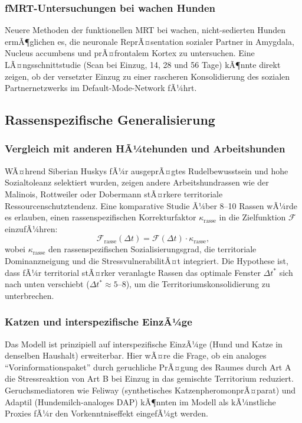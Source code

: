 ﻿\documentclass[12pt, a4paper]{article}
\theoremstyle{plain}
\theoremstyle{definition}
\theoremstyle{remark}
\newcommand{\dt}{\Delta t}
\begin{document}
\subsubsection{fMRT-Untersuchungen bei wachen Hunden}

Neuere Methoden der funktionellen MRT bei wachen, nicht-sedierten Hunden
\cite{berns2012dogs} ermÃ¶glichen es, die neuronale ReprÃ¤sentation sozialer
Partner in Amygdala, Nucleus accumbens und prÃ¤frontalem Kortex zu untersuchen.
Eine LÃ¤ngsschnittstudie (Scan bei Einzug, 14, 28 und 56 Tage) kÃ¶nnte direkt
zeigen, ob der versetzter Einzug zu einer rascheren Konsolidierung des sozialen
Partnernetzwerks im Default-Mode-Network fÃ¼hrt.

\subsection{Rassenspezifische Generalisierung}

\subsubsection{Vergleich mit anderen HÃ¼tehunden und Arbeitshunden}

WÃ¤hrend Siberian Huskys fÃ¼r ausgeprÃ¤gtes Rudelbewusstsein und hohe
Sozialtoleanz selektiert wurden, zeigen andere Arbeitshundrassen wie der
Malinois, Rottweiler oder Dobermann stÃ¤rkere territoriale Ressourcenschutztendenz.
Eine komparative Studie Ã¼ber 8--10 Rassen wÃ¼rde es erlauben, einen
rassenspezifischen Korrekturfaktor $\kappa_{\text{rasse}}$ in die Zielfunktion
$\mathcal{F}$ einzufÃ¼hren:
\begin{equation}
  \mathcal{F}_{\text{rasse}}(\dt) = \mathcal{F}(\dt) \cdot \kappa_{\text{rasse}},
\end{equation}
wobei $\kappa_{\text{rasse}}$ den rassenspezifischen Sozialisierungsgrad, die
territoriale Dominanzneigung und die StressvulnerabilitÃ¤t integriert.
Die Hypothese ist, dass fÃ¼r territorial stÃ¤rker veranlagte Rassen das optimale
Fenster $\dt^*$ sich nach unten verschiebt ($\dt^* \approx 5$--$8$), um die
Territoriumskonsolidierung zu unterbrechen.

\subsubsection{Katzen und interspezifische EinzÃ¼ge}

Das Modell ist prinzipiell auf interspezifische EinzÃ¼ge (Hund und Katze in
denselben Haushalt) erweiterbar. Hier wÃ¤re die Frage, ob ein analoges
``Vorinformationspaket'' durch geruchliche PrÃ¤gung des Raumes durch Art A
die Stressreaktion von Art B bei Einzug in das gemischte Territorium reduziert.
Geruchsmediatoren wie Feliway (synthetisches KatzenpheromonprÃ¤parat) und
Adaptil (Hundemilch-analoges DAP) kÃ¶nnten im Modell als kÃ¼nstliche Proxies
fÃ¼r den Vorkenntniseffekt eingefÃ¼gt werden.
\end{document}
